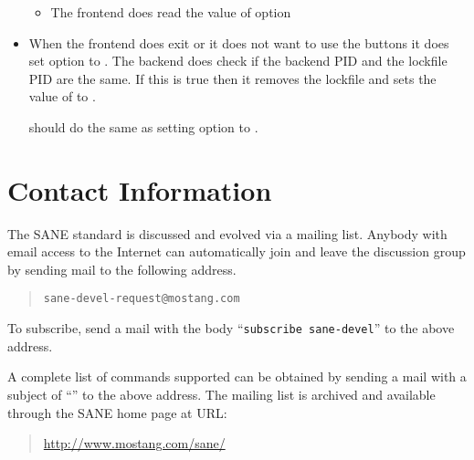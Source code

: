 \documentclass[11pt,DVIps]{report}
\begin{document}
\begin{changebar}
\begin{itemize}
\begin{itemize}
  \item
  The frontend does read the value of option 
  \end{itemize}

\item
When the frontend does exit or it does not want to use the buttons
it does set option  to .
The backend does check if the backend PID and the lockfile PID are
the same. If this is true then it removes the lockfile and sets the value 
of  to .

 should do the same as setting option
 to .

\end{itemize}
\end{changebar}





\chapter{Contact Information}\label{chap:contact}

The SANE standard is discussed and evolved via a mailing list.
Anybody with email access to the Internet can automatically join and
leave the discussion group by sending mail to the following address.
\begin{quote}
\begin{verbatim}
sane-devel-request@mostang.com
\end{verbatim}
\end{quote}
To subscribe, send a mail with the body ``\verb|subscribe sane-devel|'' to the
above address.

A complete list of commands supported can be obtained by sending a
mail with a subject of ``'' to the above address.  The
mailing list is archived and available through the SANE home page at
URL:
\begin{quote}
\url{http://www.mostang.com/sane/}
\end{quote}

\newpage

\end{document}

